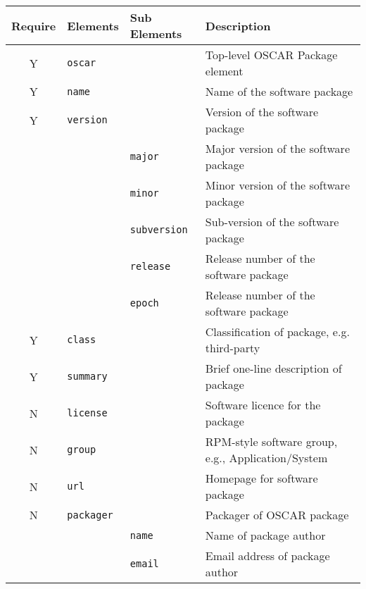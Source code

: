 \begin{table}[htbp]
  \begin{center}
  \begin{tabular}{|c|l|l|l|} \hline
  {\bfseries Require} & {\bfseries Elements} & {\bfseries Sub Elements} & {\bfseries Description}\\\hline
  \hline



  Y & \verb(oscar(   &   & Top-level OSCAR Package element               \\ \hline
  Y & \verb(name(    &   & Name of the software package                  \\ \hline


  Y & \verb(version(& & Version of the software package           \\\cline{3-4}
    & & \verb(major(  & Major version of the software package     \\\cline{3-4}
    & & \verb(minor(  & Minor version of the software package     \\\cline{3-4}
    & & \verb(subversion( & Sub-version of the software package   \\\cline{3-4}
    & & \verb(release(    & Release number of the software package\\\cline{3-4}
    & & \verb(epoch(      & Release number of the software package\\\hline


  Y & \verb(class(   &   & Classification of package, e.g. third-party   \\ \hline
  Y & \verb(summary( &   & Brief one-line description of package         \\ \hline
  N & \verb(license( &   & Software licence for the package              \\ \hline
  N & \verb(group(   &   & RPM-style software group, e.g., Application/System\\\hline
  N & \verb(url(     &   & Homepage for software package                 \\ \hline


  N & \verb(packager(&   & Packager of OSCAR package              \\\cline{3-4}
    & & \verb(name(   & Name of package author                    \\\cline{3-4}
    & & \verb(email(  & Email address of package author           \\\hline



\end{tabular}
\end{center}
\end{table}
